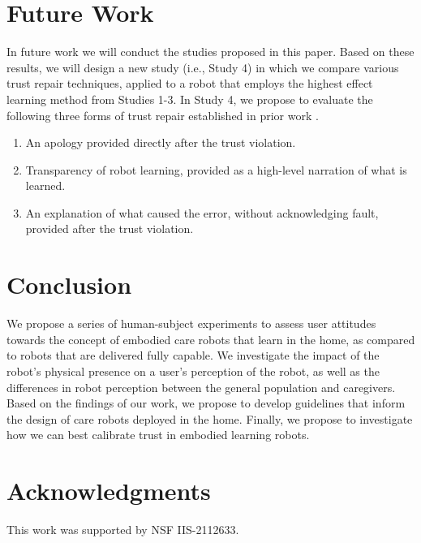 \documentclass[letterpaper]{article} %
\begin{document}
\section{Future Work}
\label{sec:futurework}
In future work we will conduct the studies proposed in this paper. Based on these results, we will design a new study (i.e., Study 4) in which we compare various trust repair techniques, applied to a robot that employs the highest effect learning method from Studies 1-3. In Study 4, we propose to evaluate the following three forms of trust repair established in prior work \cite{de_visser_towards_2020, baker_toward_2018, robinette_timing_2015, kim_repairing_2013}.

\begin{enumerate}
    \item An apology provided directly after the trust violation.
    \item Transparency of robot learning, provided as a high-level narration of what is learned.
    \item An explanation of what caused the error, without acknowledging fault, provided after the trust violation.
\end{enumerate}

\section{Conclusion}
\label{sec:conclusion}
We propose a series of human-subject experiments to assess user attitudes towards the concept of embodied care robots that learn in the home, as compared to robots that are delivered fully capable. We investigate the impact of the robot's physical presence on a user's perception of the robot, as well as the differences in robot perception between the general population and caregivers. Based on the findings of our work, we propose to develop guidelines that inform the design of care robots deployed in the home. Finally, we propose to investigate how we can best calibrate trust in embodied learning robots.

\section{Acknowledgments}
This work was supported by NSF IIS-2112633.
\end{document}
